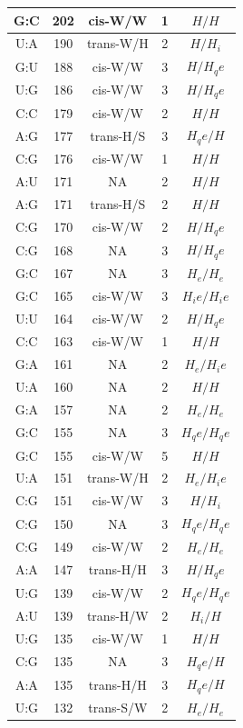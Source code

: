 \begin{center}
\begin{longtable}{c|c|c|c|c}
G:C & 202 & cis-W/W & 1 & $H/H$ \\  \hline
U:A & 190 & trans-W/H & 2 & $H/H_i$ \\  \hline
G:U & 188 & cis-W/W & 3 & $H/H_qe$ \\  \hline
U:G & 186 & cis-W/W & 3 & $H/H_qe$ \\  \hline
C:C & 179 & cis-W/W & 2 & $H/H$ \\  \hline
A:G & 177 & trans-H/S & 3 & $H_qe/H$ \\  \hline
C:G & 176 & cis-W/W & 1 & $H/H$ \\  \hline
A:U & 171 & NA & 2 & $H/H$ \\  \hline
A:G & 171 & trans-H/S & 2 & $H/H$ \\  \hline
C:G & 170 & cis-W/W & 2 & $H/H_qe$ \\  \hline
C:G & 168 & NA & 3 & $H/H_qe$ \\  \hline
G:C & 167 & NA & 3 & $H_e/H_e$ \\  \hline
G:C & 165 & cis-W/W & 3 & $H_ie/H_ie$ \\  \hline
U:U & 164 & cis-W/W & 2 & $H/H_qe$ \\  \hline
C:C & 163 & cis-W/W & 1 & $H/H$ \\  \hline
G:A & 161 & NA & 2 & $H_e/H_ie$ \\  \hline
U:A & 160 & NA & 2 & $H/H$ \\  \hline
G:A & 157 & NA & 2 & $H_e/H_e$ \\  \hline
G:C & 155 & NA & 3 & $H_qe/H_qe$ \\  \hline
G:C & 155 & cis-W/W & 5 & $H/H$ \\  \hline
U:A & 151 & trans-W/H & 2 & $H_e/H_ie$ \\  \hline
C:G & 151 & cis-W/W & 3 & $H/H_i$ \\  \hline
C:G & 150 & NA & 3 & $H_qe/H_qe$ \\  \hline
C:G & 149 & cis-W/W & 2 & $H_e/H_e$ \\  \hline
A:A & 147 & trans-H/H & 3 & $H/H_qe$ \\  \hline
U:G & 139 & cis-W/W & 2 & $H_qe/H_qe$ \\  \hline
A:U & 139 & trans-H/W & 2 & $H_i/H$ \\  \hline
U:G & 135 & cis-W/W & 1 & $H/H$ \\  \hline
C:G & 135 & NA & 3 & $H_qe/H$ \\  \hline
A:A & 135 & trans-H/H & 3 & $H_qe/H$ \\  \hline
U:G & 132 & trans-S/W & 2 & $H_e/H_e$ \\  \hline

\end{longtable}
\end{center}
